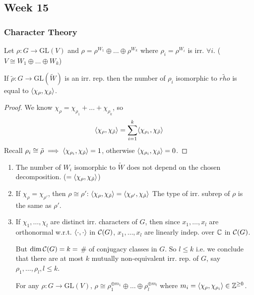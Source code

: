 \subsection{Week 15}
\subsubsection{Character Theory }

\begin{prop}
  Let $\rho: G\to \text{GL}(V)$ and
  $\rho = \rho^{W_1} \oplus \dots \oplus \rho^{W_k}$ where
  $\rho_i = \rho^{W_i}$ is irr. $\forall i$.
  ($V \cong W_1 \oplus\dots\oplus W_k$)
  
  If $\tilde{\rho}: G\to \text{GL}(\tilde{W})$ is an irr. rep. then the number
  of $\rho_i$ isomorphic to $\tilde{rho}$ is equal to
  $\langle\chi_\rho, \chi_{\tilde{\rho}}\rangle$.
  \begin{proof}
    We know $\chi_\rho = \chi_{\rho_1} + \dots + \chi_{\rho_k}$, so
    \[
      \langle\chi_\rho, \chi_{\tilde{\rho}}\rangle
      = \sum_{i=1}^k \langle\chi_{\rho_i}, \chi_{\tilde{\rho}}\rangle
    \]
    Recall $\rho_i \cong \tilde{\rho} \implies
    \langle\chi_{\rho_i}, \chi_{\tilde{\rho}}\rangle = 1$, otherwise 
    $\langle\chi_{\rho_i}, \chi_{\tilde{\rho}}\rangle = 0$.
  \end{proof}
\end{prop}

\begin{remark} \mbox{}
  \begin{enumerate}
    \item The number of $W_i$ isomorphic to $\tilde{W}$ does not depend
      on the chosen decomposition. ($= \langle\chi_\rho, \chi_{\tilde{\rho}}\rangle$)
    \item If $\chi_\rho = \chi_{\rho'}$, then $\rho \cong \rho'$:
      $\langle\chi_\rho, \chi_{\tilde{\rho}}\rangle = \langle\chi_{\rho'}, \chi_{\tilde{\rho}}\rangle$
      The type of irr. subrep of $\rho$ is the same as $\rho'$.

    \item If $\chi_1, \dots, \chi_l$ are distinct irr. characters of $G$, then
      since $x_1, \dots, x_l$ are orthonormal w.r.t. $\langle\cdot,\cdot\rangle$ in
      $\mathcal{C}(G)$, $x_1, \dots, x_l$ are linearly indep. over $\mathbb{C}$ in $\mathcal{C}(G)$.

      But $\dim \mathcal{C}(G) = k =$ \# of conjugacy classes in $G$. So
      $l \le k$ i.e. we conclude that there are at most $k$ mutually
      non-equivalent irr. rep. of $G$, say $\rho_1, \dots, \rho_l, l \le k$.

      For any $\rho: G\to \text{GL}(V)$,
      $\rho \cong \rho_1^{\oplus m_1} \oplus\dots\oplus\rho_l^{\oplus m_l}$
      where $m_i = \langle\chi_\rho, \chi_{\rho_i}\rangle \in \mathbb{Z}^{\ge 0}$.
  \end{enumerate}
\end{remark}


